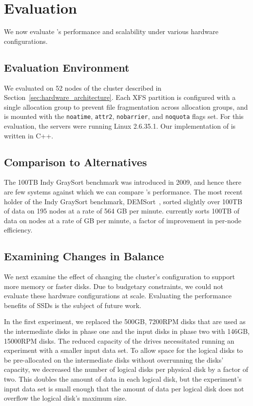 \section{Evaluation}
\label{sec:evaluation}

We now evaluate \tritonsort's performance and scalability under
various hardware configurations.

\subsection{Evaluation Environment}

We evaluated \tritonsort on 52 nodes of the cluster described in
Section~\ref{sec:hardware_architecture}.  Each XFS partition is configured with
a single allocation group to prevent file fragmentation across allocation
groups, and is mounted with the \texttt{noatime}, \texttt{attr2},
\texttt{nobarrier}, and \texttt{noquota} flags set.  For this evaluation, the
servers were running Linux 2.6.35.1. Our implementation of \tritonsort is
written in C++.

\subsection{Comparison to Alternatives}

The 100TB Indy GraySort benchmark was introduced in 2009, and hence there are
few systems against which we can compare \tritonsort's performance. The most
recent holder of the Indy GraySort benchmark, DEMSort~\cite{DEMSort}, sorted
slightly over 100TB of data on 195 nodes at a rate of 564 GB per minute.
\tritonsort currently sorts 100TB of data on \tsnodes nodes at a rate of
\tsrate GB per minute, a factor of \tsimprovementfactor improvement in per-node
efficiency.

\subsection{Examining Changes in Balance}

We next examine the effect of changing the cluster's configuration to support
more memory or faster disks. Due to budgetary constraints, we could not
evaluate these hardware configurations at scale. Evaluating
the performance benefits of SSDs is the subject of future work.

In the first experiment, we replaced the 500GB, 7200RPM disks that are used as
the intermediate disks in phase one and the input disks in phase two with
146GB, 15000RPM disks. The reduced capacity of the drives necessitated running
an experiment with a smaller input data set.  To allow space for the logical
disks to be pre-allocated on the intermediate disks without overrunning the
disks' capacity, we decreased the number of logical disks per physical disk by
a factor of two. This doubles the amount of data in each logical disk, but the
experiment's input data set is small enough that the amount of data per logical
disk does not overflow the logical disk's maximum size.

